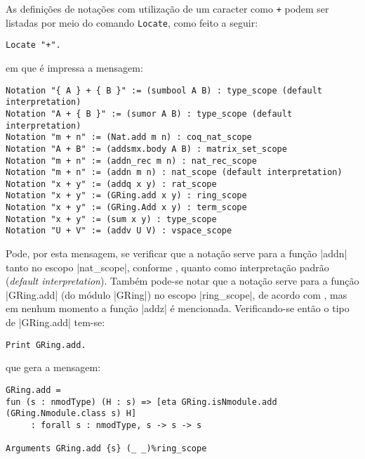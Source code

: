 As definições de notações com utilização de um caracter como \lstinline[language = coq]!+! podem ser listadas por meio do comando \lstinline[language = coq]!Locate!, como feito a seguir:
    \begin{lstlisting}[language=coq,frame=single,tabsize=1]
Locate "+". 
    \end{lstlisting}
em que é impressa a mensagem:
    \begin{lstlisting}[language=coq-error,frame=single,tabsize=1]
Notation "{ A } + { B }" := (sumbool A B) : type_scope (default interpretation)
Notation "A + { B }" := (sumor A B) : type_scope (default interpretation)
Notation "m + n" := (Nat.add m n) : coq_nat_scope
Notation "A + B" := (addsmx.body A B) : matrix_set_scope
Notation "m + n" := (addn_rec m n) : nat_rec_scope
Notation "m + n" := (addn m n) : nat_scope (default interpretation)
Notation "x + y" := (addq x y) : rat_scope
Notation "x + y" := (GRing.add x y) : ring_scope
Notation "x + y" := (GRing.Add x y) : term_scope
Notation "x + y" := (sum x y) : type_scope
Notation "U + V" := (addv U V) : vspace_scope
    \end{lstlisting}
Pode, por esta mensagem, se verificar que a notação serve para a função \coqinline|addn| tanto no escopo \coqinline|nat_scope|, conforme \cite{mathcomp-ssrnat}, quanto como interpretação padrão (\textit{default interpretation}). Também pode-se notar que a notação serve para a função \coqinline|GRing.add| (do módulo \coqinline|GRing|) no escopo \coqinline|ring_scope|, de acordo com \cite{mathcomp-ssralg}, mas em nenhum momento a função \coqinline|addz| é mencionada. Verificando-se então o tipo de \coqinline|GRing.add| tem-se:
    \begin{lstlisting}[language=coq,frame=single,tabsize=1]
Print GRing.add.
    \end{lstlisting}
que gera a mensagem:
    \begin{lstlisting}[language=coq-error,frame=single,tabsize=1]
GRing.add =
fun (s : nmodType) (H : s) => [eta GRing.isNmodule.add (GRing.Nmodule.class s) H]
     : forall s : nmodType, s -> s -> s

Arguments GRing.add {s} (_ _)%ring_scope
    \end{lstlisting}
